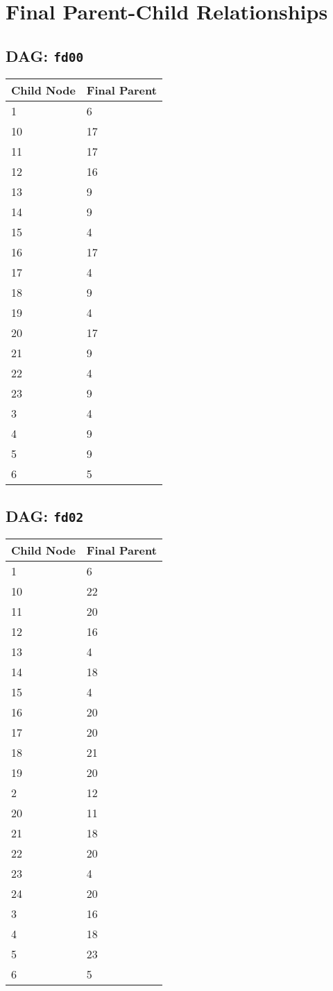 \documentclass{article}
\begin{document}
\pagestyle{fancy}
\fancyhf{}
\section*{Final Parent-Child Relationships}
\subsection*{DAG: \texttt{fd00}}
\begin{tabular}{ll}
\toprule
\textbf{Child Node} & \textbf{Final Parent} \\
\midrule
1 & 6 \\
10 & 17 \\
11 & 17 \\
12 & 16 \\
13 & 9 \\
14 & 9 \\
15 & 4 \\
16 & 17 \\
17 & 4 \\
18 & 9 \\
19 & 4 \\
20 & 17 \\
21 & 9 \\
22 & 4 \\
23 & 9 \\
3 & 4 \\
4 & 9 \\
5 & 9 \\
6 & 5 \\
\bottomrule
\end{tabular}

\subsection*{DAG: \texttt{fd02}}
\begin{tabular}{ll}
\toprule
\textbf{Child Node} & \textbf{Final Parent} \\
\midrule
1 & 6 \\
10 & 22 \\
11 & 20 \\
12 & 16 \\
13 & 4 \\
14 & 18 \\
15 & 4 \\
16 & 20 \\
17 & 20 \\
18 & 21 \\
19 & 20 \\
2 & 12 \\
20 & 11 \\
21 & 18 \\
22 & 20 \\
23 & 4 \\
24 & 20 \\
3 & 16 \\
4 & 18 \\
5 & 23 \\
6 & 5 \\
\bottomrule
\end{tabular}
\end{document}
